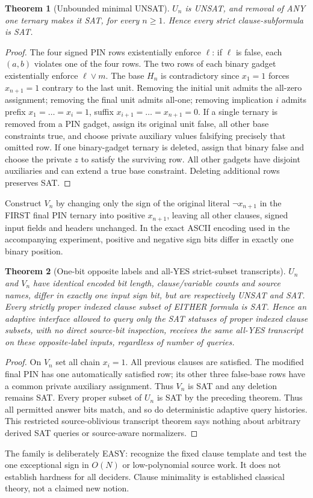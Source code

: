 \documentclass[11pt]{article}
\newtheorem{theorem}{Theorem}
\begin{document}
\begin{theorem}[Unbounded minimal UNSAT]
$U_n$ is UNSAT, and removal of ANY one ternary makes it SAT, for every $n\ge1$. Hence every strict clause-subformula is SAT.
\end{theorem}
\begin{proof}
The four signed PIN rows existentially enforce $\ell$: if $\ell$ is false, each $(a,b)$ violates one of the four rows. The two rows of each binary gadget existentially enforce $\ell\vee m$. The base $H_n$ is contradictory since $x_1=1$ forces $x_{n+1}=1$ contrary to the last unit. Removing the initial unit admits the all-zero assignment; removing the final unit admits all-one; removing implication $i$ admits prefix $x_1=\dots=x_i=1$, suffix $x_{i+1}=\dots=x_{n+1}=0$. If a single ternary is removed from a PIN gadget, assign its original unit false, all other base constraints true, and choose private auxiliary values falsifying precisely that omitted row. If one binary-gadget ternary is deleted, assign that binary false and choose the private $z$ to satisfy the surviving row. All other gadgets have disjoint auxiliaries and can extend a true base constraint. Deleting additional rows preserves SAT.
\end{proof}
Construct $V_n$ by changing only the sign of the original literal $\neg x_{n+1}$ in the FIRST final PIN ternary into positive $x_{n+1}$, leaving all other clauses, signed input fields and headers unchanged. In the exact ASCII encoding used in the accompanying experiment, positive and negative sign bits differ in exactly one binary position.
\begin{theorem}[One-bit opposite labels and all-YES strict-subset transcripts]
$U_n$ and $V_n$ have identical encoded bit length, clause/variable counts and source names, differ in exactly one input sign bit, but are respectively UNSAT and SAT. Every strictly proper indexed clause subset of EITHER formula is SAT. Hence an adaptive interface allowed to query only the SAT statuses of proper indexed clause subsets, with no direct source-bit inspection, receives the same all-YES transcript on these opposite-label inputs, regardless of number of queries.
\end{theorem}
\begin{proof}
On $V_n$ set all chain $x_i=1$. All previous clauses are satisfied. The modified final PIN has one automatically satisfied row; its other three false-base rows have a common private auxiliary assignment. Thus $V_n$ is SAT and any deletion remains SAT. Every proper subset of $U_n$ is SAT by the preceding theorem. Thus all permitted answer bits match, and so do deterministic adaptive query histories. This restricted source-oblivious transcript theorem says nothing about arbitrary derived SAT queries or source-aware normalizers.
\end{proof}
The family is deliberately EASY: recognize the fixed clause template and test the one exceptional sign in $O(N)$ or low-polynomial source work. It does not establish hardness for all deciders. Clause minimality is established classical theory, not a claimed new notion.
\end{document}
